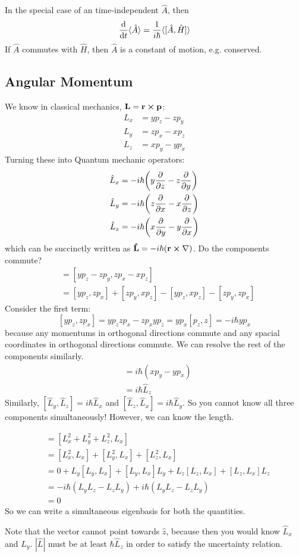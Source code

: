 In the special case of an time-independent $\hat{A}$, then
\[ \derivative{}{t}\langle\hat{A}\rangle = \frac{1}{i\hbar} \langle [\hat{A}, \hat{H}] \rangle \]
If $\hat{A}$ commutes with $\hat{H}$, then $\hat{A}$ is a constant of motion, e.g. conserved.

\subsection{Angular Momentum}
We know in classical mechanics, $\mathbf{L} = \mathbf{r} \cross \mathbf{p}$:
\begin{align*}
    L_x &= y p_z - z p_y \\
    L_y &= z p_x - x p_z \\
    L_z &= x p_y - y p_x
\end{align*}
Turning these into Quantum mechanic operators:
\begin{align*}
    \hat{L}_x &= -i\hbar\qty(y \partialderivative{}{z} - z \partialderivative{}{y}) \\
    \hat{L}_y &= -i\hbar\qty(z \partialderivative{}{x} - x \partialderivative{}{z}) \\
    \hat{L}_z &= -i\hbar\qty(x \partialderivative{}{y} - y \partialderivative{}{x}) \\
\end{align*}
which can be succinctly written as $\mathbf{\hat{L}} = -i\hbar(\mathbf{r} \cross \nabla)$. Do the components commute?
\begin{align*}
    [\hat{L}_x, \hat{L}_y] &= [yp_z - z p_y, zp_x - x p_z] \\
    &= [y p_z, zp_x] + [zp_y, xp_z] - [y p_z, x p_z] - [zp_y, zp_x]
\end{align*}
Consider the first term:
\[ [y p_z, zp_x] = y p_z z p_x - z p_x y p_z = y p_x [p_z, z] = -i \hbar y p_x\]
because any momentums in orthogonal directions commute and any spacial coordinates in orthogonal directions commute.
We can resolve the rest of the components similarly.
\begin{align*}
    [\hat{L}_x, \hat{L}_y] &= i\hbar(x p_y - y p_x) \\
    &= i\hbar \hat{L}_z
\end{align*}
Similarly, $[\hat{L}_y, \hat{L}_z] = i\hbar\hat{L}_x$ and $[\hat{L}_z, \hat{L}_x] = i\hbar\hat{L}_y$. So you cannot know
all three components simultaneously! However, we can know the length.

\begin{align*}
    [L^2, L_x] &= [L_x^2 + L_y^2 + L_z^2, L_x] \\
    &= [L_x^2, L_x] + [L_y^2, L_x] + [L_z^2, L_x] \\
    &= 0 + L_y [L_y, L_x] + [L_y, L_x]L_y + L_z [L_z, L_x] + [L_z, L_x] L_z \\
    &= - i\hbar (L_y L_z - L_z L_y) + i\hbar (L_y L_z - L_z L_y) \\
    &= 0
\end{align*}
So we can write a simultaneous eigenbasis for both the quantities.

Note that the vector cannot point towards $\hat{z}$, because then you would know $\hat{L}_x$ and $\hat{L}_y$.
$|\hat{L}|$ must be at least $\hbar \hat{L}_z$ in order to satisfy the uncertainty relation.
